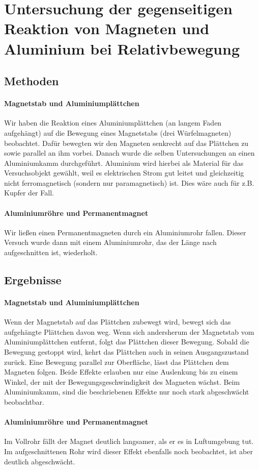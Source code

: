 \documentclass[
	a4paper,
	12pt,
	pagesize,
	ngerman
]{scrartcl}
\begin{document}
	\section{Untersuchung der gegenseitigen Reaktion von Magneten und Aluminium bei Relativbewegung}
	\subsection{Methoden}
	\paragraph{Magnetstab und Aluminiumplättchen}
	Wir haben die Reaktion eines Aluminiumplättchen (an langem Faden aufgehängt) auf die Bewegung eines Magnetstabs (drei Würfelmagneten) beobachtet. Dafür bewegten wir den Magneten senkrecht auf das Plättchen zu sowie parallel an ihm vorbei.
	Danach wurde die selben Untersuchungen an einen Aluminiumkamm durchgeführt. Aluminium wird hierbei als Material für das Versuchsobjekt gewählt, weil es elektrischen Strom gut leitet und gleichzeitig nicht ferromagnetisch (sondern nur paramagnetisch) ist. Dies wäre auch für z.B. Kupfer der Fall. 
	\paragraph{Aluminiumröhre und Permanentmagnet}
	Wir ließen einen Permanentmagneten durch ein Aluminiumrohr fallen. Dieser Versuch wurde dann mit einem Aluminiumrohr, das der Länge nach aufgeschnitten ist, wiederholt.
	\subsection{Ergebnisse}
	\paragraph{Magnetstab und Aluminiumplättchen}
	Wenn der Magnetstab auf das Plättchen zubewegt wird, bewegt sich das aufgehängte Plättchen davon weg. Wenn sich andersherum der Magnetstab vom Aluminiumplättchen entfernt, folgt das Plättchen dieser Bewegung. Sobald die Bewegung gestoppt wird, kehrt das Plättchen auch in seinen Ausgangszustand zurück. Eine Bewegung parallel zur Oberfläche, lässt das Plättchen dem Magneten folgen. Beide Effekte erlauben nur eine Auslenkung bis zu einem Winkel, der mit der Bewegungsgeschwindigkeit des Magneten wächst.
	Beim Aluminiumkamm, sind die beschriebenen Effekte nur noch stark abgeschwächt beobachtbar.
	\paragraph{Aluminiumröhre und Permanentmagnet}
	Im Vollrohr fällt der Magnet deutlich langsamer, als er es in Luftumgebung tut. Im aufgeschnittenen Rohr wird dieser Effekt ebenfalls noch beobachtet, ist aber deutlich abgeschwächt.
\end{document}

